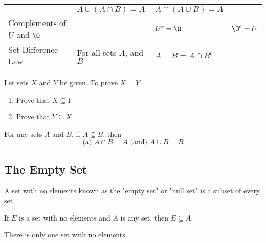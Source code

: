 \documentclass[11pt]{article}
\begin{document}
\begin{table}[!htbp]
\begin{adjustwidth}{-1.5cm}{-1.5cm}
{\begin{tabular}{ *{4}{l} }
                                    & $A \cup (A \cap B) = A$
                                    & $A \cap (A \cup B) = A$ \\
            Complements of
                $U$ and $\O$        &
                                    & $U^c = \O$
                                    & $\O^c = U$ \\
                Set Difference Law  & For all sets $A$, and $B$
                                    & $A - B = A \cap B^c$
                                    & \\
            \bottomrule
        \end{tabular}
        \label{tab:tbl-set-identities}
        }
        \end{adjustwidth}
    \end{table}

\begin{definition}\label{def:prove-set-eq}
    Let sets $X$ and $Y$ be given. To prove $X = Y$
    \begin{enumerate}
        \item Prove that $X \subseteq Y$
        \item Prove that $Y \subseteq X$
    \end{enumerate}
\end{definition}

\begin{definition}\label{def:intersect-union-subset}
    For any sets $A$ and $B$, if $A \subseteq B$, then
    \begin{equation*}
        \text{(a) } A \cap B = A \text{ (and) } A \cup B = B
    \end{equation*}
\end{definition}

\subsection{The Empty Set}

\begin{definition}\label{def:empty-set-thm}
    A set with no elements known as the "empty set" or "null set" is a subset of every set.

    If $E$ is a set with no elements and $A$ is any set, then $E \subseteq A$.
\end{definition}

\begin{definition}\label{def:empty-set-unique}
    There is only one set with no elements.
\end{definition}
\end{document}
